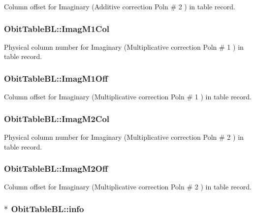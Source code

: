 Column offset for Imaginary (Additive correction Poln \# 2 ) in table record. 

\subsubsection{ {\bf Obit\-Table\-BL::Imag\-M1Col}}\label{structObitTableBL_o33}


Physical column number for Imaginary (Multiplicative correction Poln \# 1 ) in table record. 

\subsubsection{ {\bf Obit\-Table\-BL::Imag\-M1Off}}\label{structObitTableBL_o32}


Column offset for Imaginary (Multiplicative correction Poln \# 1 ) in table record. 

\subsubsection{ {\bf Obit\-Table\-BL::Imag\-M2Col}}\label{structObitTableBL_o41}


Physical column number for Imaginary (Multiplicative correction Poln \# 2 ) in table record. 

\subsubsection{ {\bf Obit\-Table\-BL::Imag\-M2Off}}\label{structObitTableBL_o40}


Column offset for Imaginary (Multiplicative correction Poln \# 2 ) in table record. 

\subsubsection{$\ast$ {\bf Obit\-Table\-BL::info}}\label{structObitTableBL_o5}


